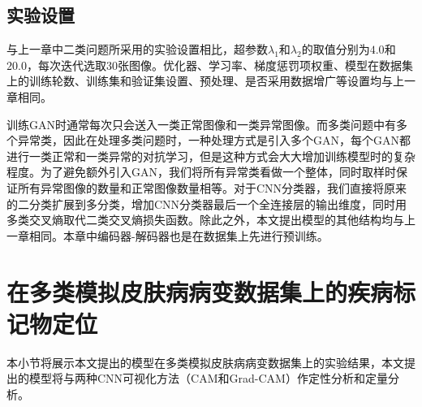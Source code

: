 \subsection{实验设置}\label{sec:multi_classes_experiment_setting}
与上一章中二类问题所采用的实验设置相比，超参数$\lambda_{1}$和$\lambda_{2}$的取值分别为$4.0$和$20.0$，每次迭代选取$30$张图像。优化器、学习率、梯度惩罚项权重、模型在数据集上的训练轮数、训练集和验证集设置、预处理、是否采用数据增广等设置均与上一章相同。

训练GAN时通常每次只会送入一类正常图像和一类异常图像。而多类问题中有多个异常类，因此在处理多类问题时，一种处理方式是引入多个GAN，每个GAN都进行一类正常和一类异常的对抗学习，但是这种方式会大大增加训练模型时的复杂程度。为了避免额外引入GAN，我们将所有异常类看做一个整体，同时取样时保证所有异常图像的数量和正常图像数量相等。对于CNN分类器，我们直接将原来的二分类扩展到多分类，增加CNN分类器最后一个全连接层的输出维度，同时用多类交叉熵取代二类交叉熵损失函数。除此之外，本文提出模型的其他结构均与上一章相同。本章中编码器-解码器也是在数据集上先进行预训练。
\section{在多类模拟皮肤病病变数据集上的疾病标记物定位}\label{sec:multi_classes_experiments_res}
本小节将展示本文提出的模型在多类模拟皮肤病病变数据集上的实验结果，本文提出的模型将与两种CNN可视化方法（CAM和Grad-CAM）作定性分析和定量分析。

